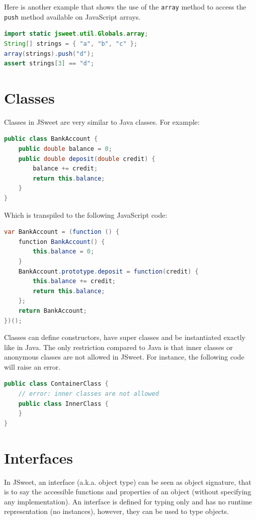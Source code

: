 \documentclass[a4paper]{report}
\begin{document}
\noindent
Here is another example that shows the use of the \texttt{array} method to access the \texttt{push} method available on JavaScript arrays.

\begin{lstlisting}[language=Java]
import static jsweet.util.Globals.array;
String[] strings = { "a", "b", "c" };
array(strings).push("d");
assert strings[3] == "d";
\end{lstlisting}

\section{Classes}

Classes in JSweet are very similar to Java classes. For example:

\begin{lstlisting}[language=Java]
public class BankAccount {  
    public double balance = 0;  
    public double deposit(double credit) {  
        balance += credit;  
        return this.balance;  
    }  
}  
\end{lstlisting}

\noindent
Which is transpiled to the following JavaScript code:

\begin{lstlisting}[language=Java]
var BankAccount = (function () {  
    function BankAccount() {  
        this.balance = 0;  
    }  
    BankAccount.prototype.deposit = function(credit) {  
        this.balance += credit;  
        return this.balance;  
    };  
    return BankAccount;  
})();
\end{lstlisting}

Classes can define constructors, have super classes and be instantiated exactly like in Java. The only restriction compared to Java is that inner classes or anonymous classes are not allowed in JSweet. For instance, the following code will raise an error.

\begin{lstlisting}[language=Java]
public class ContainerClass {
	// error: inner classes are not allowed
	public class InnerClass {
	}
}
\end{lstlisting}

\section{Interfaces}

In JSweet, an interface (a.k.a. object type) can be seen as object signature, that is to say the accessible functions and properties of an object (without specifying any implementation). An interface is defined for typing only and has no runtime representation (no instances), however, they can be used to type objects.
\end{document}
